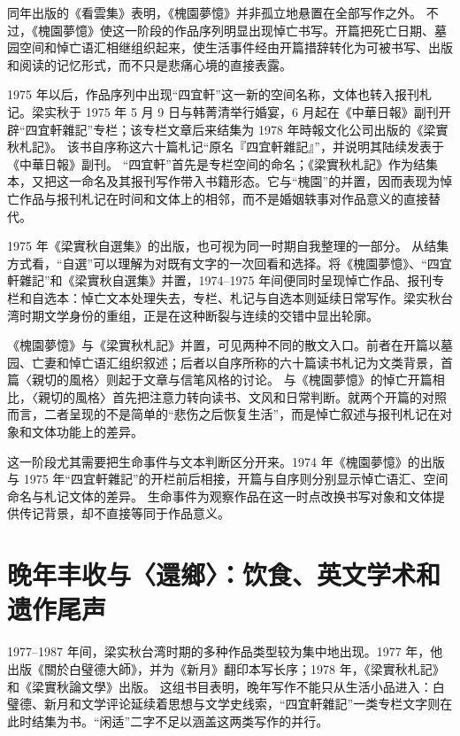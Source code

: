 \documentclass[UTF8,a4paper,zihao=-4,fontset=none]{ctexart}
\begin{document}
同年出版的《看雲集》表明，《槐園夢憶》并非孤立地悬置在全部写作之外。\autocite{nmtl_liang_chronology} 不过，《槐園夢憶》使这一阶段的作品序列明显出现悼亡书写。开篇把死亡日期、墓园空间和悼亡语汇相继组织起来，使生活事件经由开篇措辞转化为可被书写、出版和阅读的记忆形式，而不只是悲痛心境的直接表露。\autocite{liang_huaiyuan_mengyi_fareast_scan_pages}

1975 年以后，作品序列中出现“四宜軒”这一新的空间名称，文体也转入报刊札记。梁实秋于 1975 年 5 月 9 日与韩菁清举行婚宴，6 月起在《中華日報》副刊开辟“四宜軒雜記”专栏；该专栏文章后来结集为 1978 年時報文化公司出版的《梁實秋札記》。\autocite{nmtl_liang_chronology,liang1978_zhaji} 该书自序称这六十篇札记“原名『四宜軒雜記』”\autocite{liang1981_zhaji_4th}，并说明其陆续发表于《中華日報》副刊。\autocite{liang1981_zhaji_4th} “四宜軒”首先是专栏空间的命名；《梁實秋札記》作为结集本，又把这一命名及其报刊写作带入书籍形态。它与“槐園”的并置，因而表现为悼亡作品与报刊札记在时间和文体上的相邻，而不是婚姻轶事对作品意义的直接替代。

1975 年《梁實秋自選集》的出版，也可视为同一时期自我整理的一部分。\autocite{nmtl_liang_chronology} 从结集方式看，“自選”可以理解为对既有文字的一次回看和选择。将《槐園夢憶》、“四宜軒雜記”和《梁實秋自選集》并置，1974--1975 年间便同时呈现悼亡作品、报刊专栏和自选本：悼亡文本处理失去，专栏、札记与自选本则延续日常写作。梁实秋台湾时期文学身份的重组，正是在这种断裂与连续的交错中显出轮廓。

《槐園夢憶》与《梁實秋札記》并置，可见两种不同的散文入口。前者在开篇以墓园、亡妻和悼亡语汇组织叙述；后者以自序所称的六十篇读书札记为文类背景，首篇〈親切的風格〉则起于文章与信笔风格的讨论。\autocite{liang_huaiyuan_mengyi_fareast_scan_pages,liang1981_zhaji_4th} 与《槐園夢憶》的悼亡开篇相比，〈親切的風格〉首先把注意力转向读书、文风和日常判断。就两个开篇的对照而言，二者呈现的不是简单的“悲伤之后恢复生活”，而是悼亡叙述与报刊札记在对象和文体功能上的差异。

这一阶段尤其需要把生命事件与文本判断区分开来。1974 年《槐園夢憶》的出版与 1975 年“四宜軒雜記”的开栏前后相接，开篇与自序则分别显示悼亡语汇、空间命名与札记文体的差异。\autocite{nmtl_liang_chronology,liang_huaiyuan_mengyi_fareast_scan_pages,liang1981_zhaji_4th} 生命事件为观察作品在这一时点改换书写对象和文体提供传记背景，却不直接等同于作品意义。

\section{晚年丰收与〈還鄉〉：饮食、英文学术和遗作尾声}

1977--1987 年间，梁实秋台湾时期的多种作品类型较为集中地出现。1977 年，他出版《關於白璧德大師》，并为《新月》翻印本写长序；1978 年，《梁實秋札記》和《梁實秋論文學》出版。\autocite{nmtl_liang_chronology,liang1978_zhaji} 这组书目表明，晚年写作不能只从生活小品进入：白璧德、新月和文学评论延续着思想与文学史线索，“四宜軒雜記”一类专栏文字则在此时结集为书。“闲适”二字不足以涵盖这两类写作的并行。
\end{document}
